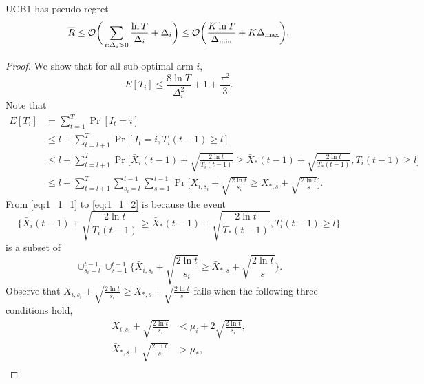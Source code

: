 \begin{thm}
    UCB1 has pseudo-regret
    \begin{equation}
        {\overline{R}} \le \mathcal{O}\bigg(\sum_{i:\Delta_i>0} \frac{\ln T}{\Delta_i}+\Delta_i\bigg)
            \le \mathcal{O}\bigg(\frac{K\ln T}{\Delta_\text{min}}+K\Delta_\text{max}\bigg). \label{eq:1_thm}
    \end{equation}
\end{thm}
\begin{proof}
    We show that for all sub-optimal arm $i$,
    \begin{equation}
        E[T_i] \le \frac{8\ln T}{\Delta_i^2} + 1 + \frac{\pi^2}{3}.
    \end{equation}
    Note that
    \begin{align}
        E[T_i]
            &= \sum_{t=1}^T \Pr[I_t=i] \\
            &\le l + \sum_{t=l+1}^T \Pr[I_t=i, T_i(t-1)\ge l] \\
            &\le l + \sum_{t=l+1}^T \Pr\Bigg[\bar X_{i}(t-1) +
                \sqrt{\frac{2\ln t}{T_i(t-1)}}\ge \bar X_{*}(t-1)+
                \sqrt{\frac{2\ln t}{T_{*}(t-1)}}, T_i(t-1)\ge l\Bigg] \label{eq:1_1_1}\\
            &\le l + \sum_{t=l+1}^T \sum_{s_i=l}^{t-1} \sum_{s=1}^{t-1}
                \Pr\Bigg[\bar X_{i,s_i} + \sqrt{\frac{2\ln t}{s_i}}\ge
                \bar X_{*,s}+\sqrt{\frac{2\ln t}{s}}\Bigg]. \label{eq:1_1_2}
    \end{align}
    From \eqref{eq:1_1_1} to \eqref{eq:1_1_2} is because the event
    \begin{equation}
        \Bigg\{\bar X_{i}(t-1) + \sqrt{\frac{2\ln t}{T_i(t-1)}}\ge
        \bar X_{*}(t-1)+\sqrt{\frac{2\ln t}{T_{*}(t-1)}}, T_i(t-1)\ge l\Bigg\}
    \end{equation}
    is a subset of
    \begin{equation}
        \cup_{s_i=l}^{t-1} \cup_{s=1}^{t-1}\Bigg\{\bar X_{i,s_i} + \sqrt{\frac{2\ln t}{s_i}}\ge
        \bar X_{*,s}+\sqrt{\frac{2\ln t}{s}}\Bigg\}.
    \end{equation}
    Observe that $\bar X_{i,s_i} + \sqrt{\frac{2\ln t}{s_i}}\ge\bar X_{*,s}+\sqrt{\frac{2\ln t}{s}}$
    fails when the following three conditions hold,
    \begin{align}
        \bar X_{i,s_i} + \sqrt{\frac{2\ln t}{s_i}} &< \mu_i + 2\sqrt{\frac{2\ln t}{s_i}}, \label{eq:1_2} \\
        \bar X_{*,s} + \sqrt{\frac{2\ln t}{s}} &> \mu_*,  \\

\end{align}
\end{proof}
